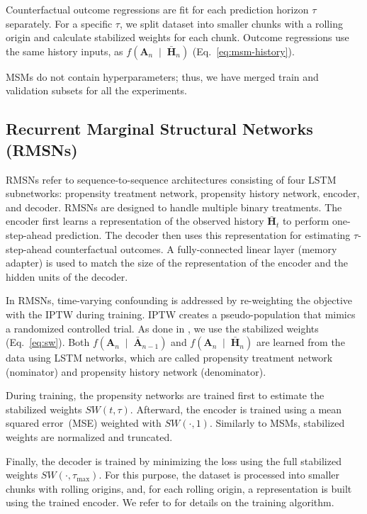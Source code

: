 \documentclass{article}
\theoremstyle{plain}
\theoremstyle{definition}
\theoremstyle{remark}
\begin{document}
Counterfactual outcome regressions are fit for each prediction horizon $\tau$ separately. For a specific $\tau$, we split dataset into smaller chunks with a rolling origin and calculate stabilized weights for each chunk. Outcome regressions use the same history inputs, as $f\left(\mathbf{A}_n  \;\mid\;  \bar{\mathbf{H}}_{n} \right)$ (Eq.~\eqref{eq:msm-history}). 

MSMs do not contain hyperparameters; thus, we have merged train and validation subsets for all the experiments. 


\subsection{Recurrent Marginal Structural Networks (RMSNs)}

RMSNs refer to sequence-to-sequence architectures consisting of four LSTM subnetworks: propensity treatment network, propensity history network, encoder, and decoder. RMSNs are designed to handle multiple binary treatments. The encoder first learns a representation of the observed history $\bar{\mathbf{H}}_t$ to perform one-step-ahead prediction. The decoder then uses this representation for estimating $\tau$-step-ahead counterfactual outcomes. A fully-connected linear layer (memory adapter) is used to match the size of the representation  of the encoder and the hidden units of the decoder. 

In RMSNs, time-varying confounding is addressed by re-weighting the objective with the IPTW \cite{robins2000marginal} during training. IPTW creates a pseudo-population that mimics a randomized controlled trial. As done in \cite{lim2018forecasting}, we use the stabilized weights (Eq.~\eqref{eq:sw}). Both $f\left(\mathbf{A}_n  \;\mid\;  \bar{\mathbf{A}}_{n-1}\right)$ and $f\left(\mathbf{A}_n  \;\mid\;  \bar{\mathbf{H}}_{n} \right)$ are learned from the data using LSTM networks, which are called propensity treatment network (nominator) and propensity history network (denominator).

During training, the propensity networks are trained first to estimate the stabilized weights $SW(t, \tau)$. Afterward, the encoder is trained using a mean squared error~(MSE) weighted with $SW( \cdot, 1 )$. Similarly to MSMs, stabilized weights are normalized and truncated.

Finally, the decoder is trained by minimizing the loss using the full stabilized weights $SW( \cdot, \tau_{\text{max}})$. For this purpose, the dataset is processed into smaller chunks with rolling origins, and, for each rolling origin, a representation is built using the trained encoder. We refer to \cite{lim2018forecasting} for details on the training algorithm.
\end{document}
